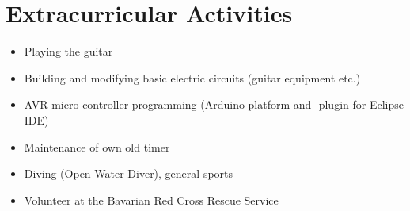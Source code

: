 

\section*{Extracurricular Activities}

\begin{itemize}
	\item Playing the guitar
	\item Building and modifying basic electric circuits (guitar equipment etc.)
	\item AVR micro controller programming (Arduino-platform and -plugin for Eclipse IDE)
	\item Maintenance of own old timer
	\item Diving (Open Water Diver), general sports
	\item Volunteer at the Bavarian Red Cross Rescue Service
\end{itemize}